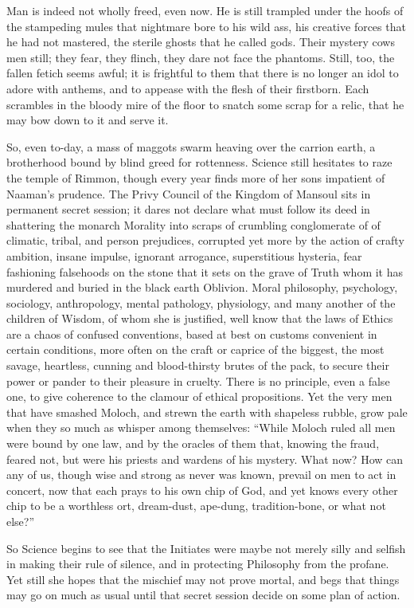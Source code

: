 Man is indeed not wholly freed, even now. He is still trampled under the hoofs of the stampeding mules that nightmare bore to his wild ass, his creative forces that he had not mastered, the sterile ghosts that he called gods. Their mystery cows men still; they fear, they flinch, they dare not face the phantoms. Still, too, the fallen fetich seems awful; it is frightful to them that there is no longer an idol to adore with anthems, and to appease with the flesh of their firstborn. Each scrambles in the bloody mire of the floor to snatch some scrap for a relic, that he may bow down to it and serve it.

So, even to-day, a mass of maggots swarm heaving over the carrion earth, a brotherhood bound by blind greed for rottenness. Science still hesitates to raze the temple of Rimmon, though every year finds more of her sons impatient of Naaman's prudence. The Privy Council of the Kingdom of Mansoul sits in permanent secret session; it dares not declare what must follow its deed in shattering the monarch Morality into scraps of crumbling conglomerate of of climatic, tribal, and person prejudices, corrupted yet more by the action of crafty ambition, insane impulse, ignorant arrogance, superstitious hysteria, fear fashioning falsehoods on the stone that it sets on the grave of Truth whom it has murdered and buried in the black earth Oblivion. Moral philosophy, psychology, sociology, anthropology, mental pathology, physiology, and many another of the children of Wisdom, of whom she is justified, well know that the laws of Ethics are a chaos of confused conventions, based at best on customs convenient in certain conditions, more often on the craft or caprice of the biggest, the most savage, heartless, cunning and blood-thirsty brutes of the pack, to secure their power or pander to their pleasure in cruelty. There is no principle, even a false one, to give coherence to the clamour of ethical propositions. Yet the very men that have smashed Moloch, and strewn the earth with shapeless rubble, grow pale when they so much as whisper among themselves: \enquote{While Moloch ruled all men were bound by one law, and by the oracles of them that, knowing the fraud, feared not, but were his priests and wardens of his mystery. What now? How can any of us, though wise and strong as never was known, prevail on men to act in concert, now that each prays to his own chip of God, and yet knows every other chip to be a worthless ort, dream-dust, ape-dung, tradition-bone, or \textemdash{} what not else?}

So Science begins to see that the Initiates were maybe not merely silly and selfish in making their rule of silence, and in protecting Philosophy from the profane. Yet still she hopes that the mischief may not prove mortal, and begs that things may go on much as usual until that secret session decide on some plan of action.

